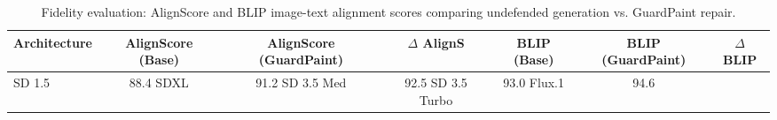 \begin{table}
\caption{Fidelity evaluation: AlignScore and BLIP image-text alignment scores comparing undefended generation vs. GuardPaint repair.}
\label{tab:fidelity}
\begin{tabular}{lcccccc}
\toprule
Architecture & AlignScore (Base) & AlignScore (GuardPaint) & $\Delta$ AlignS & BLIP (Base) & BLIP (GuardPaint) & $\Delta$ BLIP \\
\midrule
SD 1.5 & 88.4%
SDXL & 91.2%
SD 3.5 Med & 92.5%
SD 3.5 Turbo & 93.0%
Flux.1 & 94.6%
\bottomrule
\end{tabular}
\end{table}
